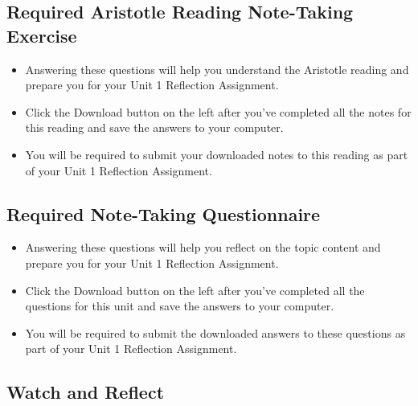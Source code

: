 \documentclass[
]{book}
\providecommand{\tightlist}{%
  \setlength{\itemsep}{0pt}\setlength{\parskip}{0pt}}
\begin{document}
\hypertarget{required-aristotle-reading-note-taking-exercise}{%
\subsection*{Required Aristotle Reading Note-Taking Exercise}\label{required-aristotle-reading-note-taking-exercise}}

\begin{reflect}
\begin{itemize}
\tightlist
\item
  Answering these questions will help you understand the Aristotle reading and prepare you for your Unit 1 Reflection Assignment.
\item
  Click the Download button on the left after you've completed all the notes for this reading and save the answers to your computer.
\item
  You will be required to submit your downloaded notes to this reading as part of your Unit 1 Reflection Assignment.
\end{itemize}
\end{reflect}

\hypertarget{required-note-taking-questionnaire-2}{%
\subsection*{Required Note-Taking Questionnaire}\label{required-note-taking-questionnaire-2}}

\begin{reflect}
\begin{itemize}
\tightlist
\item
  Answering these questions will help you reflect on the topic content and prepare you for your Unit 1 Reflection Assignment.
\item
  Click the Download button on the left after you've completed all the questions for this unit and save the answers to your computer.
\item
  You will be required to submit the downloaded answers to these questions as part of your Unit 1 Reflection Assignment.
\end{itemize}
\end{reflect}

\hypertarget{watch-and-reflect-5}{%
\subsection*{Watch and Reflect}\label{watch-and-reflect-5}}
\end{document}
